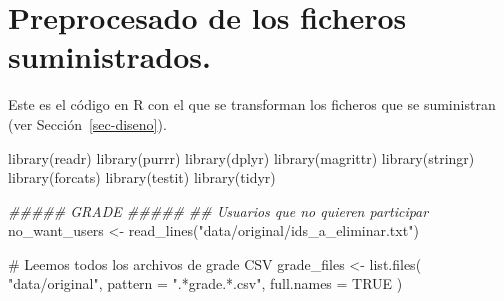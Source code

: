 \documentclass[
  12pt,
  a4paper,
  extrafontsizes,
  onecolumn,
  openright]{memoir}
\newenvironment{Shaded}{\begin{snugshade}}{\end{snugshade}}
\newcommand{\AttributeTok}[1]{\textcolor[rgb]{0.40,0.45,0.13}{#1}}
\newcommand{\CommentTok}[1]{\textcolor[rgb]{0.37,0.37,0.37}{#1}}
\newcommand{\ConstantTok}[1]{\textcolor[rgb]{0.56,0.35,0.01}{#1}}
\newcommand{\DocumentationTok}[1]{\textcolor[rgb]{0.37,0.37,0.37}{\textit{#1}}}
\newcommand{\FunctionTok}[1]{\textcolor[rgb]{0.28,0.35,0.67}{#1}}
\newcommand{\NormalTok}[1]{\textcolor[rgb]{0.00,0.23,0.31}{#1}}
\newcommand{\OtherTok}[1]{\textcolor[rgb]{0.00,0.23,0.31}{#1}}
\newcommand{\StringTok}[1]{\textcolor[rgb]{0.13,0.47,0.30}{#1}}
\begin{document}
\hypertarget{sec-preprocess}{%
\chapter{Preprocesado de los ficheros
suministrados.}\label{sec-preprocess}}

Este es el código en R con el que se transforman los ficheros que se
suministran (ver Sección~\ref{sec-diseno}).

\footnotesize

\begin{Shaded}
\begin{Highlighting}[]
\FunctionTok{library}\NormalTok{(readr)}
\FunctionTok{library}\NormalTok{(purrr)}
\FunctionTok{library}\NormalTok{(dplyr)}
\FunctionTok{library}\NormalTok{(magrittr)}
\FunctionTok{library}\NormalTok{(stringr)}
\FunctionTok{library}\NormalTok{(forcats)}
\FunctionTok{library}\NormalTok{(testit)}
\FunctionTok{library}\NormalTok{(tidyr)}

\DocumentationTok{\#\#\#\#\# GRADE \#\#\#\#\#}
\DocumentationTok{\#\# Usuarios que no quieren participar}
\NormalTok{no\_want\_users }\OtherTok{\textless{}{-}} \FunctionTok{read\_lines}\NormalTok{(}\StringTok{"data/original/ids\_a\_eliminar.txt"}\NormalTok{)}

\CommentTok{\# Leemos todos los archivos de grade CSV}
\NormalTok{grade\_files }\OtherTok{\textless{}{-}} \FunctionTok{list.files}\NormalTok{(}
    \StringTok{"data/original"}\NormalTok{, }\AttributeTok{pattern =} \StringTok{".*grade.*.csv"}\NormalTok{, }\AttributeTok{full.names =} \ConstantTok{TRUE}
\NormalTok{)}


\end{Highlighting}
\end{Shaded}
\end{document}
